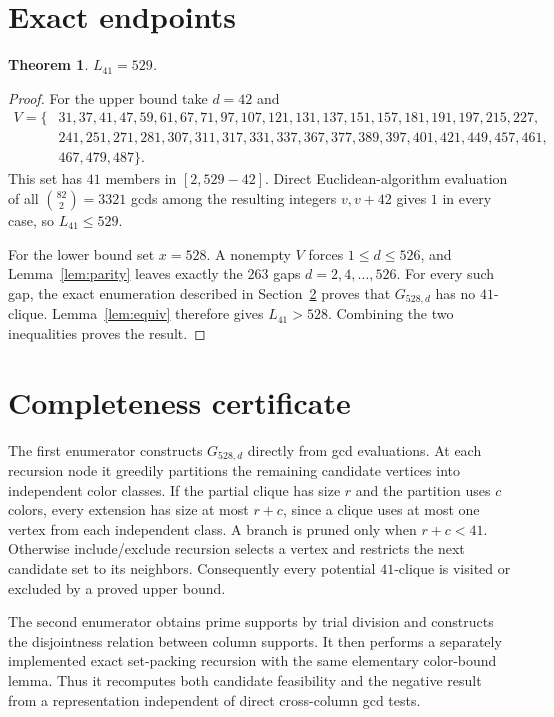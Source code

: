\documentclass[11pt]{article}
\newtheorem{theorem}{Theorem}
\begin{document}
\section{Exact endpoints}
\begin{theorem}\label{thm:main}
$L_{41}=529$.
\end{theorem}
\begin{proof}
For the upper bound take $d=42$ and
\begin{align*}
V=\{&31,37,41,47,59,61,67,71,97,107,121,131,137,151,157,181,191,197,215,227,\\
&241,251,271,281,307,311,317,331,337,367,377,389,397,401,421,449,457,461,\\
&467,479,487\}.
\end{align*}
This set has $41$ members in $[2,529-42]$.  Direct Euclidean-algorithm
evaluation of all $\binom{82}{2}=3321$ gcds among the resulting integers
$v,v+42$ gives $1$ in every case, so $L_{41}\le529$.

For the lower bound set $x=528$.  A nonempty $V$ forces
$1\le d\le526$, and Lemma~\ref{lem:parity} leaves exactly the $263$ gaps
$d=2,4,\ldots,526$.  For every such gap, the exact enumeration described in
Section~\ref{sec:certificate} proves that $G_{528,d}$ has no $41$-clique.
Lemma~\ref{lem:equiv} therefore gives $L_{41}>528$.  Combining the two
inequalities proves the result.
\end{proof}
\section{Completeness certificate}\label{sec:certificate}
The first enumerator constructs $G_{528,d}$ directly from gcd evaluations.
At each recursion node it greedily partitions the remaining candidate
vertices into independent color classes.  If the partial clique has size $r$
and the partition uses $c$ colors, every extension has size at most $r+c$,
since a clique uses at most one vertex from each independent class.  A branch
is pruned only when $r+c<41$.  Otherwise include/exclude recursion selects a
vertex and restricts the next candidate set to its neighbors.  Consequently
every potential $41$-clique is visited or excluded by a proved upper bound.

The second enumerator obtains prime supports by trial division and constructs
the disjointness relation between column supports.  It then performs a
separately implemented exact set-packing recursion with the same elementary
color-bound lemma.  Thus it recomputes both candidate feasibility and the
negative result from a representation independent of direct cross-column gcd
tests.
\end{document}
